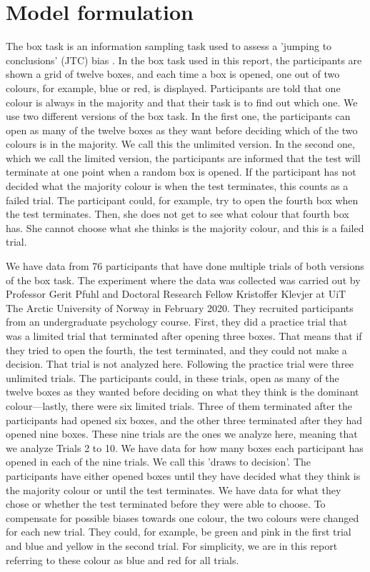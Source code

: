\newpage
\chapter{Model formulation}
\label{Chapter_Problem_setup}
The box task is an information sampling task used to assess a 'jumping to conclusions' (JTC) bias \citep{balzan2017}. In the box task used in this report, the participants are shown a grid of twelve boxes, and each time a box is opened, one out of two colours, for example, blue or red, is displayed. Participants are told that one colour is always in the majority and that their task is to find out which one. We use two different versions of the box task. In the first one, the participants can open as many of the twelve boxes as they want before deciding which of the two colours is in the majority. We call this the unlimited version. In the second one, which we call the limited version, the participants are informed that the test will terminate at one point when a random box is opened. 
If the participant has not decided what the majority colour is when the test terminates, this counts as a failed trial. 
The participant could, for example, try to open the fourth box when the test terminates. Then, she does not get to see what colour that fourth box has. She cannot choose what she thinks is the majority colour, and this is a failed trial.

We have data from 76 participants that have done multiple trials of both versions of the box task. The experiment where the data was collected was carried out by Professor Gerit Pfuhl and Doctoral Research Fellow Kristoffer Klevjer at UiT The Arctic University of Norway in February 2020. They recruited participants from an undergraduate psychology course. First, they did a practice trial that was a limited trial that terminated after opening three boxes. That means that if they tried to open the fourth, the test terminated, and they could not make a decision. That trial is not analyzed here. Following the practice trial were three unlimited trials. The participants could, in these trials, open as many of the twelve boxes as they wanted before deciding on what they think is the dominant colour—lastly, there were six limited trials. Three of them terminated after the participants had opened six boxes, and the other three terminated after they had opened nine boxes. These nine trials are the ones we analyze here, meaning that we analyze Trials 2 to 10. We have data for how many boxes each participant has opened in each of the nine trials. We call this 'draws to decision'. The participants have either opened boxes until they have decided what they think is the majority colour or until the test terminates. We have data for what they chose or whether the test terminated before they were able to choose. To compensate for possible biases towards one colour, the two colours were changed for each new trial. They could, for example, be green and pink in the first trial and blue and yellow in the second trial. For simplicity, we are in this report referring to these colour as blue and red for all trials.

